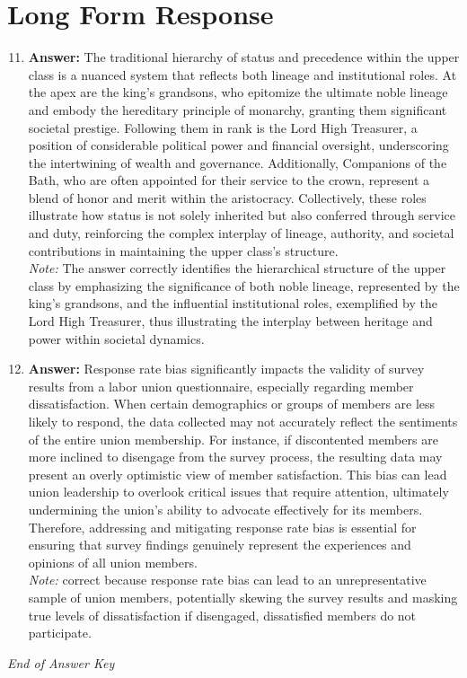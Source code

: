 \documentclass[12pt]{article}
\begin{document}
\section*{Long Form Response}
\begin{enumerate}[label=\arabic*.]
\setcounter{enumi}{10}
\item \textbf{Answer:} The traditional hierarchy of status and precedence within the upper class is a nuanced system that reflects both lineage and institutional roles. At the apex are the king's grandsons, who epitomize the ultimate noble lineage and embody the hereditary principle of monarchy, granting them significant societal prestige. Following them in rank is the Lord High Treasurer, a position of considerable political power and financial oversight, underscoring the intertwining of wealth and governance. Additionally, Companions of the Bath, who are often appointed for their service to the crown, represent a blend of honor and merit within the aristocracy. Collectively, these roles illustrate how status is not solely inherited but also conferred through service and duty, reinforcing the complex interplay of lineage, authority, and societal contributions in maintaining the upper class's structure.
\\ \textit{Note:} The answer correctly identifies the hierarchical structure of the upper class by emphasizing the significance of both noble lineage, represented by the king's grandsons, and the influential institutional roles, exemplified by the Lord High Treasurer, thus illustrating the interplay between heritage and power within societal dynamics.
\item \textbf{Answer:} Response rate bias significantly impacts the validity of survey results from a labor union questionnaire, especially regarding member dissatisfaction. When certain demographics or groups of members are less likely to respond, the data collected may not accurately reflect the sentiments of the entire union membership. For instance, if discontented members are more inclined to disengage from the survey process, the resulting data may present an overly optimistic view of member satisfaction. This bias can lead union leadership to overlook critical issues that require attention, ultimately undermining the union's ability to advocate effectively for its members. Therefore, addressing and mitigating response rate bias is essential for ensuring that survey findings genuinely represent the experiences and opinions of all union members.
\\ \textit{Note:} correct because response rate bias can lead to an unrepresentative sample of union members, potentially skewing the survey results and masking true levels of dissatisfaction if disengaged, dissatisfied members do not participate.
\end{enumerate}

\vfill
\noindent\textit{End of Answer Key}
\end{document}
